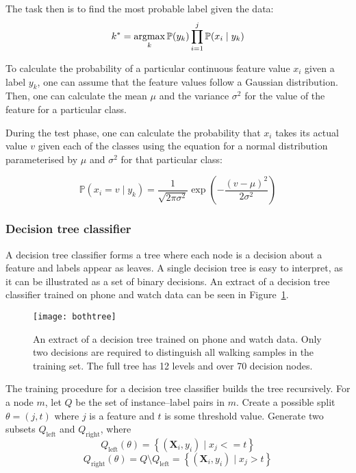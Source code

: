         The task then is to find the most probable label given the data: $$k^* = \operatorname*{argmax}_k \mathbb{P}(y_k) \prod\limits_{i=1}^{j} \mathbb{P}(x_i \mid y_k)$$
      
        To calculate the probability of a particular continuous feature value $x_i$ given a label $y_k$, one can assume that the feature values follow a Gaussian distribution. Then, one can calculate the mean $\mu$ and the variance $\sigma^2$ for the value of the feature for a particular class.
      
        During the test phase, one can calculate the probability that $x_i$ takes its actual value $v$ given each of the classes using the equation for a normal distribution parameterised by $\mu$ and $\sigma^2$ for that particular class:
      
        $$\mathbb{P}(x_i = v \mid y_k) = \frac{1}{\sqrt{2 \pi \sigma^2}} \exp \left(-\frac{(v - \mu)^2}{2 \sigma^2}\right)$$
        
      \subsubsection{Decision tree classifier}
        A decision tree classifier forms a tree where each node is a decision about a feature and labels appear as leaves. A single decision tree is easy to interpret, as it can be illustrated as a set of binary decisions. An extract of a decision tree classifier trained on phone and watch data can be seen in Figure~\ref{fig:decision-tree}.
        
        \begin{figure}[!b]
          \centering
          \texttt{[image: bothtree]}
          \caption[An extract of a decision tree classifier]{An extract of a decision tree trained on phone and watch data. Only two decisions are required to distinguish all walking samples in the training set. The full tree has 12 levels and over 70 decision nodes.}
          \label{fig:decision-tree}
        \end{figure}
        
        The training procedure for a decision tree classifier builds the tree recursively. For a node $m$, let $Q$ be the set of instance--label pairs in $m$. Create a possible split $\theta = (j, t)$ where $j$ is a feature and $t$ is some threshold value. Generate two subsets $Q_\mathrm{left}$ and $Q_\mathrm{right}$, where 
        $$Q_\mathrm{left}(\theta) = \left\{ (\mathbf{X}_i,y_i) \mid x_j <= t \right \}$$
        $$Q_\mathrm{right}(\theta) = Q \setminus Q_\mathrm{left} = \left\{ (\mathbf{X}_i,y_i) \mid x_j > t \right \}$$
      
